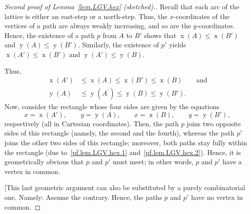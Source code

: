 \documentclass[reqno]{amsart}
\newcommand{\0}{\phantom{c}}
\DeclareMathOperator{\xcoord}{x} %
\DeclareMathOperator{\ycoord}{y} %
\newenvironment{verlong}{}{}
\theoremstyle{plain}
\theoremstyle{definition}
\numberwithin{equation}{section}
\begin{document}
\begin{verlong}
\begin{proof}[Second proof of Lemma~\ref{lem.LGV.hex} (sketched).]
Recall that each arc of the lattice is either an east-step or a north-step.
Thus, the $x$-coordinates of the vertices of a path are always weakly increasing, and so are the $y$-coordinates.
Hence, the existence of a path $p$ from $A$ to $B'$ shows that $\xcoord(A) \leq \xcoord(B')$ and $\ycoord(A) \leq \ycoord(B')$.
Similarly, the existence of $p'$ yields $\xcoord(A') \leq \xcoord(B')$ and $\ycoord(A') \leq\ycoord(B)$.

Thus,
\begin{align}
\xcoord\left(  A'\right)   &  \leq\xcoord\left(
A\right)  \leq\xcoord\left(  B'\right)  \leq
\xcoord\left(  B\right)  \qquad\text{and}\label{pf.lem.LGV.hex.1}\\
\ycoord\left(  A\right)   &  \leq\ycoord\left(  A^{\prime
}\right)  \leq\ycoord\left(  B\right)  \leq\ycoord\left(
B'\right)  . \label{pf.lem.LGV.hex.2}
\end{align}
Now, consider the rectangle whose four sides are given by the equations
\[
x=\xcoord\left(  A'\right)  , \qquad
y=\ycoord\left(  A\right)  , \qquad
x=\xcoord\left(  B\right)  , \qquad
y=\ycoord\left(  B'\right)  ,
\]
respectively (all in Cartesian coordinates). Then, the path $p$ joins two
opposite sides of this rectangle (namely, the second and the fourth), whereas
the path $p'$ joins the other two sides of this rectangle; moreover,
both paths stay fully within the rectangle (due to~\eqref{pf.lem.LGV.hex.1}
and~\eqref{pf.lem.LGV.hex.2}). Hence, it is geometrically obvious that $p$ and
$p'$ must meet; in other words, $p$ and $p'$ have a vertex in common.

[This last geometric argument can also be substituted by a purely
combinatorial one. Namely: Assume the contrary. Hence, the paths $p$ and
$p'$ have no vertex in common.


\end{proof}
\end{verlong}
\end{document}
